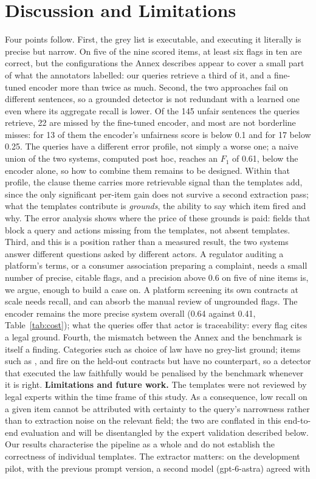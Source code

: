 \section{Discussion and Limitations}
\label{sec:discussion}
Four points follow. First, the grey list is executable, and executing it literally is precise but narrow. On five of the nine scored items, at least six flags in ten are correct, but the configurations the Annex describes appear to cover a small part of what the \corpus{} annotators labelled: our queries retrieve a third of it, and a fine-tuned encoder more than twice as much. Second, the two approaches fail on different sentences, so a grounded detector is not redundant with a learned one even where its aggregate recall is lower. Of the 145 unfair sentences the queries retrieve, 22 are missed by the fine-tuned encoder, and most are not borderline misses: for 13 of them the encoder's unfairness score is below 0.1 and for 17 below 0.25. The queries have a different error profile, not simply a worse one; a naive union of the two systems, computed post hoc, reaches an $F_1$ of 0.61, below the encoder alone, so how to combine them remains to be designed. Within that profile, the clause theme carries more retrievable signal than the templates add, since the only significant per-item gain does not survive a second extraction pass; what the templates contribute is \emph{grounds}, the ability to say which item fired and why. The error analysis shows where the price of these grounds is paid: fields that block a query and actions missing from the templates, not absent templates. Third, and this is a position rather than a measured result, the two systems answer different questions asked by different actors. A regulator auditing a platform's terms, or a consumer association preparing a complaint, needs a small number of precise, citable flags, and a precision above 0.6 on five of nine items is, we argue, enough to build a case on. A platform screening its own contracts at scale needs recall, and can absorb the manual review of ungrounded flags. The encoder remains the more precise system overall (0.64 against 0.41, Table~\ref{tab:cost}); what the queries offer that actor is traceability: every flag cites a legal ground. Fourth, the mismatch between the Annex and the benchmark is itself a finding. Categories such as choice of law have no grey-list ground; items such as ,  and  fire on the held-out contracts but have no \corpus{} counterpart, so a detector that executed the law faithfully would be penalised by the benchmark whenever it is right. \textbf{Limitations and future work.} The templates were not reviewed by legal experts within the time frame of this study. As a consequence, low recall on a given item cannot be attributed with certainty to the query's narrowness rather than to extraction noise on the relevant field; the two are conflated in this end-to-end evaluation and will be disentangled by the expert validation described below. Our results characterise the pipeline as a whole and do not establish the correctness of individual templates. The extractor matters: on the development pilot, with the previous prompt version, a second model (gpt-6-astra) agreed with 